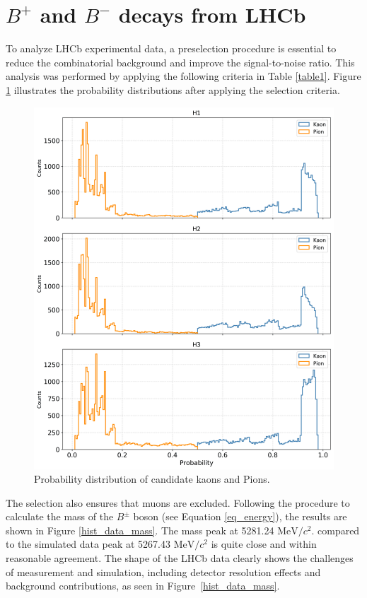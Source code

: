 \section{\(B^+\) and  \(B^-\) decays from LHCb}

   To analyze LHCb experimental data, a preselection procedure is essential to reduce the combinatorial background and improve the signal-to-noise ratio. 
   This analysis was performed by applying the following criteria in Table \ref{table1}. Figure \ref{hist_prob} illustrates the probability distributions after applying the selection criteria.
   
    \begin{figure}[H]
        \centering
        \includegraphics[scale=0.1]{Figure/hist_prob.png}
        \caption{Probability distribution of candidate kaons and Pions.}
        \label{hist_prob}
    \end{figure}

   The selection also ensures that muons are excluded. Following the procedure to calculate the mass of the \( B^\pm \) boson (see Equation \ref{eq_energy}), the results are shown in Figure \ref{hist_data_mass}. The mass peak at 5281.24 \(\text{MeV/$c^{2}$}\). compared to the simulated data peak at 5267.43 \(\text{MeV/$c^{2}$}\) is quite close and within reasonable agreement. The shape of the LHCb data clearly shows the challenges of measurement and simulation, including detector resolution effects and background contributions, as seen in Figure~\ref{hist_data_mass}.
   
